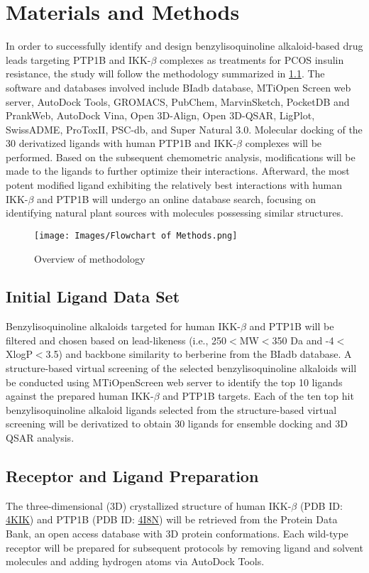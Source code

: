 \chapter{Materials and Methods}

In order to successfully identify and design benzylisoquinoline alkaloid-based drug leads targeting PTP1B and IKK-$\beta$ complexes as treatments for PCOS insulin resistance, the study will follow the methodology summarized in \ref{fig:methodology}. The software and databases involved include BIadb database, MTiOpen Screen web server, AutoDock Tools, GROMACS, PubChem, MarvinSketch, PocketDB and PrankWeb, AutoDock Vina, Open 3D-Align, Open 3D-QSAR, LigPlot, SwissADME, ProToxII, PSC-db, and Super Natural 3.0. Molecular docking of the 30 derivatized ligands with human  PTP1B and IKK-$\beta$ complexes will be performed. Based on the subsequent chemometric analysis, modifications will be made to the ligands to further optimize their interactions. Afterward, the most potent modified ligand exhibiting the relatively best interactions with human IKK-$\beta$ and PTP1B will undergo an online database search, focusing on identifying natural plant sources with molecules possessing similar structures. 

\begin{figure} 
            \centering
            \texttt{[image: Images/Flowchart of Methods.png]}
            \caption{Overview of methodology}
            \label{fig:methodology}
        \end{figure}


\section{Initial Ligand Data Set}
Benzylisoquinoline alkaloids targeted for human IKK-$\beta$ and PTP1B  will be filtered and chosen based on lead-likeness (i.e., 250$<$MW$<$350 Da and -4$<$XlogP$<$3.5) and backbone similarity to berberine from the BIadb database. A structure-based virtual screening of the selected benzylisoquinoline alkaloids will be conducted using MTiOpenScreen web server to identify the top 10 ligands against the prepared human IKK-$\beta$ and PTP1B targets.  Each of the ten top hit benzylisoquinoline alkaloid ligands selected from the structure-based virtual screening will be derivatized to obtain 30 ligands for ensemble docking and 3D QSAR analysis. 

\section{Receptor and Ligand Preparation}
The three-dimensional (3D) crystallized structure of human IKK-$\beta$ (PDB ID: \href{https://www.rcsb.org/structure/4KIK}{4KIK}) and PTP1B (PDB ID: \href{https://www.rcsb.org/structure/4I8N}{4I8N}) will be retrieved from the Protein Data Bank, an open access database with 3D protein conformations. Each wild-type receptor will be prepared for subsequent protocols by removing ligand and solvent molecules and adding hydrogen atoms via AutoDock Tools. 

